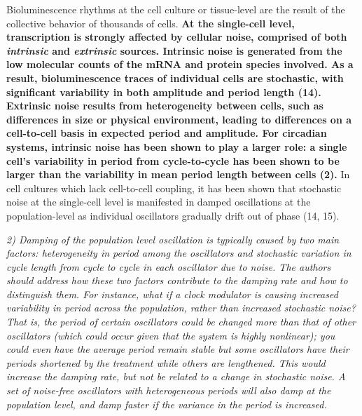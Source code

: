 \documentclass[11pt, letterpaper]{article}
\newenvironment{reviewer}{\itshape\color{gray}}{}
\newenvironment{manuscript}[1]{\begin{center}\begin{tcolorbox}[colback=green!5!white,colframe=green!75!black,width=0.8\textwidth,title={#1},breakable,fonttitle=\bfseries]}{\end{tcolorbox}\end{center}}
\begin{document}
\begin{manuscript}{Page 3}
 Bioluminescence rhythms at the cell culture or tissue-level are the result of the collective behavior of thousands of cells.
 {\bfseries
At the single-cell level, transcription is strongly affected by cellular noise, comprised of both {\itshape intrinsic} and {\itshape extrinsic} sources.
Intrinsic noise is generated from the low molecular counts of the mRNA and protein species involved.
As a result, bioluminescence traces of individual cells are stochastic, with significant variability in both amplitude and period length (14). 
Extrinsic noise results from heterogeneity between cells, such as differences in size or physical environment, leading to differences on a cell-to-cell basis in expected period and amplitude.
For circadian systems, intrinsic noise has been shown to play a larger role: a single cell's variability in period from cycle-to-cycle has been shown to be larger than the variability in mean period length between cells (2).
}
In cell cultures which lack cell-to-cell coupling, it has been shown that  stochastic noise at the single-cell level is manifested in damped oscillations at the population-level as individual oscillators gradually drift out of phase (14, 15).  
\end{manuscript}


\begin{reviewer}
2) Damping of the population level oscillation is typically caused by two main factors: heterogeneity in period among the oscillators and stochastic variation in cycle length from cycle to cycle in each oscillator due to noise. 
The authors should address how these two factors contribute to the damping rate and how to distinguish them. 
For instance, what if a clock modulator is causing increased variability in period across the population, rather than increased stochastic noise? That is, the period of certain oscillators could be changed more than that of other oscillators (which could occur given that the system is highly nonlinear); you could even have the average period remain stable but some oscillators have their periods shortened by the treatment while others are lengthened. 
This would increase the damping rate, but not be related to a change in stochastic noise. 
A set of noise-free oscillators with heterogeneous periods will also damp at the population level, and damp faster if the variance in the period is increased.
\end{reviewer}
\end{document}
